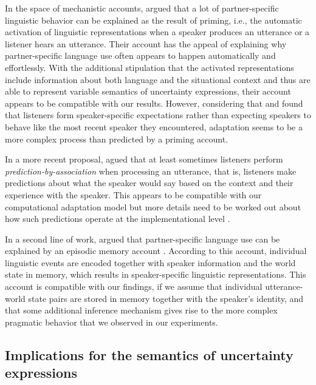 \documentclass[man, floatsintext]{apa6}
\begin{document}
In the space of mechanistic accounts, \textcite{Pickering2004} argued that a lot of partner-specific linguistic behavior
 can be explained as the result of priming, i.e., the automatic activation of linguistic representations when 
a speaker produces an utterance or a listener hears an utterance. Their account has the appeal
of explaining why partner-specific language use often appears to happen automatically and effortlessly. 
With the additional stipulation that the activated representations include information about both language
and the situational context and thus are able to represent variable semantics of uncertainty expressions,
their account appears to be compatible with our results. However, considering that \textcite{Yildirim2016} and 
\textcite{Schuster2019} found that listeners form speaker-specific expectations rather than expecting speakers
to behave like the most recent speaker they encountered, adaptation seems to be a more complex process than predicted by a
priming account.

In a more recent proposal, \textcite{Pickering2013} agued that
at least sometimes listeners perform \textit{prediction-by-association} when processing
an utterance, that is, listeners make predictions about what the speaker would say based on
the context and their experience with the speaker.  This appears to
be compatible with our computational adaptation model but more details need to be
worked out about how such predictions operate at the implementational level \parencite{Marr1982}.

In a second line of work, \textcite{Horton2005,Horton2016} argued that partner-specific
language use can be explained by an episodic memory account \parencite{Goldinger1998,Johnson1997,Pierrehumbert2001}.
According to this account, individual linguistic events are encoded together with
speaker information and the world state in memory, which results in speaker-specific
linguistic representations. This account is compatible with our findings, if we assume
that individual utterance-world state pairs are stored in memory together with the speaker's 
identity, and that some additional inference mechanism gives rise to the more complex
pragmatic behavior that we observed in our experiments.



\subsection{Implications for the semantics of uncertainty expressions}
\end{document}
